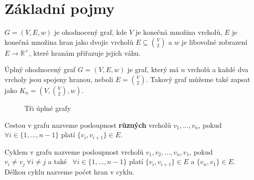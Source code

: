 \section{Základní pojmy}
\label{sec:zakladni-pojmy}


\begin{definition}
    \label{definice:ohodnoceny_graf}
    $G = (V, E, w)$ je ohodnocený graf, kde $V$ je konečná množina vrcholů, $E$ je konečná množina hran jako dvojic vrcholů $E \subseteq{{V}\choose{2}}$ a $w$ je libovolné zobrazení $E \rightarrow \mathds{R}^+$, které hranám přiřazuje jejich váhu.
\end{definition}

\begin{definition}
    \label{definice:uplny_ohodnoceny_graf}
    Úplný ohodnocený graf $G = (V, E, w)$ je graf, který má $n$ vrcholů a každé dva vrcholy jsou spojeny hranou, neboli $E = {{V}\choose{2}}$. Takový graf můžeme také zapsat jako $K_n = (V, {{V}\choose{2}}, w)$.
    \begin{figure}[h]
        \centering
        \begin{subfigure}[b]{0.3\textwidth}
        \end{subfigure}%
        \begin{subfigure}[b]{0.3\textwidth}
        \end{subfigure}%
        \begin{subfigure}[b]{0.3\textwidth}
        \end{subfigure}
        \caption{Tři úplné grafy}
    \end{figure}
\end{definition}

\begin{definition}[cesta]
    \label{definice:cesta}
    Cestou v grafu nazveme posloupnost \textbf{různých} vrcholů $v_1, \dots, v_n$, pokud $\forall i \in \{1,\dots, n-1\}$ platí $\{v_i, v_{i+1}\} \in E$.  
\end{definition}

\begin{definition}[Cyklus]
    \label{definice:cyklus}
    Cyklem v grafu nazveme posloupnost vrcholů $v_1, v_2, \dots, v_n, v_1$, pokud  $v_i \neq v_j~\forall i \neq j$ a také~  $\forall i \in \{1,\dots, n-1\}$ platí $\{v_i, v_{i+1}\} \in E$ a $\{v_n, v_1\} \in E$. Délkou cyklu nazveme počet hran v cyklu.
\end{definition}

